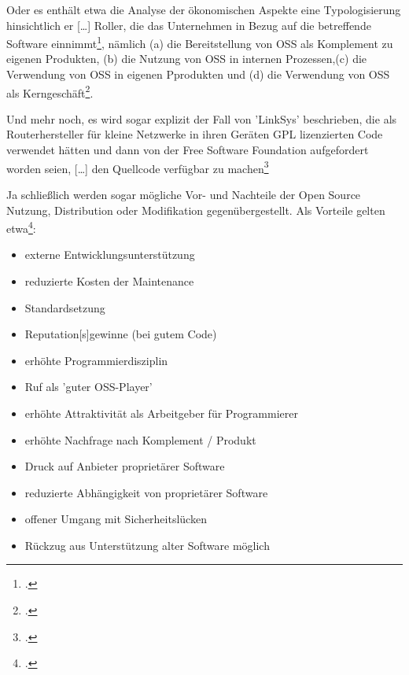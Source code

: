 \documentclass[DIV=calc,BCOR=5mm,11pt,headings=small,oneside,abstract=true, toc=bib]{scrartcl}
\begin{document}
Oder es enthält etwa die Analyse der \glqq{}ökonomischen Aspekte\grqq{} eine
Typologisierung hinsichtlich er \glqq{}[\ldots] Roller, die das Unternehmen in
Bezug auf die betreffende Software
einnimmt\grqq{}\footcite[vgl.][102]{BruHarPicCreFieHen2004a}, nämlich (a) die
\glqq{}Bereitstellung von OSS als Komplement zu eigenen Produkten\grqq{}, (b)
die \glqq{}Nutzung von OSS in internen Prozessen\grqq{},(c) die
\glqq{}Verwendung von OSS in eigenen Pprodukten\grqq{} und (d) die
\glqq{}Verwendung von OSS als
Kerngeschäft\grqq{}\footcite[vgl.][103]{BruHarPicCreFieHen2004a}. 

Und mehr noch,
es wird sogar explizit der Fall von 'LinkSys' beschrieben, die als
\glqq{}Routerhersteller für kleine Netzwerke\grqq{} in ihren Geräten GPL
lizenzierten Code verwendet hätten und dann von der \glqq{}Free Software
Foundation\grqq{} aufgefordert worden seien, \glqq{}[\ldots] den
Quellcode verfügbar zu
machen\grqq{}\footcite[vgl.][111]{BruHarPicCreFieHen2004a}

Ja schließlich werden sogar mögliche Vor- und Nachteile der Open Source
Nutzung, Distribution oder Modifikation gegenübergestellt. Als Vorteile gelten
etwa\footcite[vgl.][114]{BruHarPicCreFieHen2004a}:
\begin{itemize}
  \item \glqq{}externe Entwicklungsunterstützung\grqq{}
  \item \glqq{}reduzierte Kosten der Maintenance\grqq{}
  \item \glqq{}Standardsetzung\grqq{}
  \item \glqq{}Reputation[s]gewinne (bei gutem Code)\grqq{}
  \item \glqq{}erhöhte Programmierdisziplin\grqq{}
  \item \glqq{}Ruf als 'guter OSS-Player'\grqq{}
  \item \glqq{}erhöhte Attraktivität als Arbeitgeber für Programmierer\grqq{}
  \item \glqq{}erhöhte Nachfrage nach Komplement / Produkt\grqq{}
  \item \glqq{}Druck auf Anbieter proprietärer Software\grqq{}
  \item \glqq{}reduzierte Abhängigkeit von proprietärer Software\grqq{}
  \item \glqq{}offener Umgang mit Sicherheitslücken\grqq{}
  \item \glqq{}Rückzug aus Unterstützung alter Software möglich\grqq{}
\end{itemize}
\end{document}
